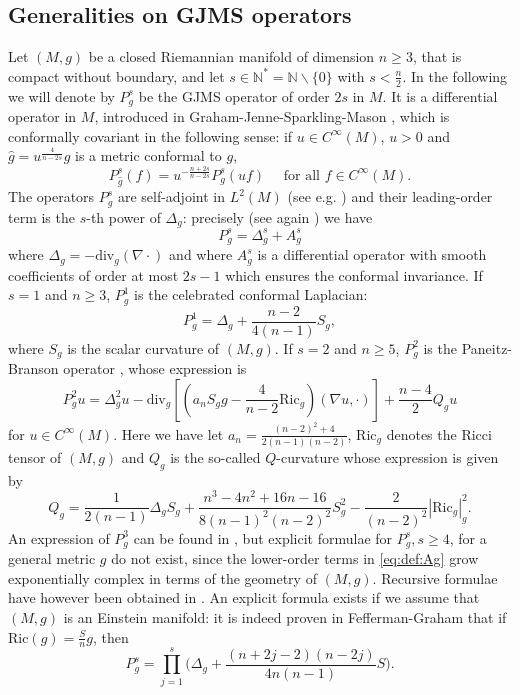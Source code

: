 \documentclass[10pt]{amsart}
\numberwithin{equation}{section}
\theoremstyle{plain}
\theoremstyle{remark}
\begin{document}
\subsection{Generalities on GJMS operators} \label{GJMS}
Let $(M,g)$ be a closed Riemannian manifold of dimension $n \ge 3$, that is compact without boundary, and let $s \in \mathbb{N}^* = \mathbb{N}\backslash \{0\}$ with $s < \frac{n}{2}$. In the following we will denote by $P_g^s$ be the GJMS operator of order $2s$ in $M$. It is a differential operator in $M$, introduced in Graham-Jenne-Sparkling-Mason \cite{GJMS}, which is conformally covariant in the following sense: if $u \in C^\infty(M)$, $u>0$ and $\hat{g}  = u^{\frac{4}{n-2s}}g$ is a metric conformal to $g$,
\begin{equation} \label{eq:confinv}
P_{\hat g}^s (f)  =  u^{- \frac{n+2s}{n-2s}} P_g^s(u f) \quad \text{ for all } f \in C^\infty(M). 
\end{equation}
The operators $P_g^s$ are self-adjoint in $L^2(M)$ (see e.g. \cite{GrahamZworski}) and their leading-order term is the $s$-th power of $\Delta_g$: precisely (see again \cite{GJMS}) we have
\begin{equation} \label{eq:def:Ag}
 P_g^s = \Delta_g^s + A_g^s
 \end{equation}
 where $\Delta_g = - \text{div}_g(\nabla \cdot)$ and where $A_g^s$ is a differential operator with smooth coefficients of order at most $2s-1$ which ensures the conformal invariance. If $s=1$ and $n \ge 3$, $P_g^1$ is the celebrated conformal Laplacian:
$$ P_g^1 = \Delta_g + \frac{n-2}{4(n-1)} S_g, $$
where $S_g$ is the scalar curvature of $(M,g)$. If $s=2$ and $n \ge 5$, $P_g^2$ is the Paneitz-Branson operator \cite{Branson, Paneitz}, whose expression is 
$$ P_g^2u = \Delta_g^2 u - \text{div}_g \left[  \left( a_n S_g g  - \frac{4}{n-2} \text{Ric}_g \right)(\nabla u, \cdot) \right] + \frac{n-4}{2} Q_g u $$
for $u \in C^\infty(M)$. Here we have let $a_n =\frac{(n-2)^2+4}{2(n-1)(n-2)}$, $\text{Ric}_g$ denotes the Ricci tensor of $(M,g)$ and $Q_g$ is the so-called $Q$-curvature whose expression is given by 
$$ Q_g = \frac{1}{2(n-1)} \Delta_g S_g + \frac{n^3-4n^2+16n-16}{8(n-1)^2(n-2)^2} S_g^2 - \frac{2}{(n-2)^2}|\text{Ric}_g|_g^2. $$
\medskip
An expression of $P_g^3$ can be found in \cite{Juhl}, but explicit formulae for $P_g^s, s\ge 4$, for a general metric $g$ do not exist,  since the lower-order terms in \eqref{eq:def:Ag} grow exponentially complex in terms of the geometry of $(M,g)$. Recursive formulae have however been obtained in  \cite{Juhl}. An explicit formula exists if we assume that $(M,g)$ is an Einstein manifold: it is indeed proven in Fefferman-Graham \cite[Proposition 7.9]{FeffermanGraham} that if $\text{Ric}(g) =  \frac{S}{n} g$, then  
\begin{equation} \label{factor:Pg}
 P_{g}^{s} = \prod_{j=1}^s \Big( \Delta_{g} + \frac{(n+2j-2)(n-2j)}{4n(n-1)} S \Big). 
 \end{equation}
\end{document}
